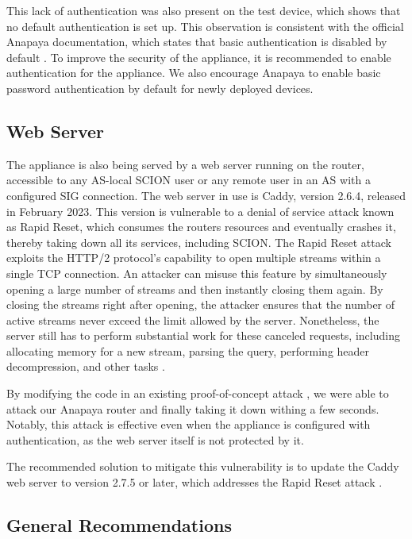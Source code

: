 This lack of authentication was also present on the test device, which shows that no default authentication is set up.
This observation is consistent with the official Anapaya documentation, which states that basic authentication is disabled by default \cite{anapayaManagemenDoc}.
To improve the security of the appliance, it is recommended to enable authentication for the appliance.
We also encourage Anapaya to enable basic password authentication by default for newly deployed devices.


\subsection{Web Server}
The appliance is also being served by a web server running on the router, accessible to any AS-local SCION user or any remote user in an AS with a configured SIG connection.
The web server in use is Caddy, version 2.6.4, released in February 2023.
This version is vulnerable to a denial of service attack known as Rapid Reset, which consumes the routers resources and eventually crashes it, thereby taking down all its services, including SCION.
The Rapid Reset attack exploits the HTTP/2 protocol's capability to open multiple streams within a single TCP connection.
An attacker can misuse this feature by simultaneously opening a large number of streams and then instantly closing them again.
By closing the streams right after opening, the attacker ensures that the number of active streams never exceed the limit allowed by the server.
Nonetheless, the server still has to perform substantial work for these canceled requests, including allocating memory for a new stream, parsing the query, performing header decompression, and other tasks \cite{googleWorksNovel}.

By modifying the code in an existing proof-of-concept attack \cite{githubGitHubMicrictorhttp2rststream}, we were able to attack our Anapaya router and finally taking it down withing a few seconds.
Notably, this attack is effective even when the appliance is configured with authentication, as the web server itself is not protected by it.

The recommended solution to mitigate this vulnerability is to update the Caddy web server to version 2.7.5 or later, which addresses the Rapid Reset attack \cite{githubReleasesCaddyservercaddy}.



\subsection{General Recommendations}


